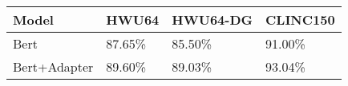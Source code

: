 \begin{tabular}{llll}
\toprule
       Model &  HWU64 & HWU64-DG & CLINC150 \\
\midrule
        Bert & 87.65\% &   85.50\% &   91.00\% \\
Bert+Adapter & 89.60\% &   89.03\% &   93.04\% \\
\bottomrule
\end{tabular}
